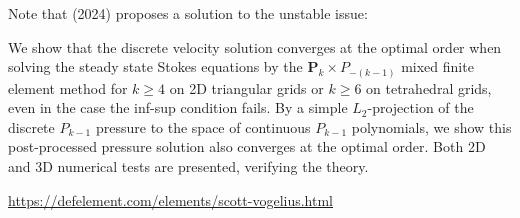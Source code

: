  
Note that \textcite{zhan24} (2024) proposes a solution to the unstable issue: 
\begin{displayquote}
{\color{darkgray}
We show that the discrete velocity solution converges at
the optimal order when solving the steady state Stokes
equations by the ${\bm P}_k\times P_{-(k-1)}$ mixed finite element method for
$k \ge 4$ on 2D triangular grids or $k \ge 6$ on tetrahedral grids,
even in the case the inf-sup condition fails. By a simple
$L_2$-projection of the discrete $P_{k-1}$ pressure to the space of
continuous $P_{k-1}$ polynomials, we show this post-processed
pressure solution also converges at the optimal order. Both
2D and 3D numerical tests are presented, verifying the
theory.
}
\end{displayquote}




\begin{center}
\url{https://defelement.com/elements/scott-vogelius.html}
\end{center}


